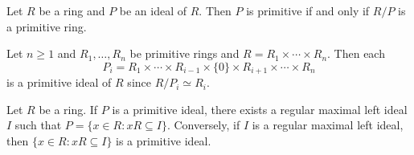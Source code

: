 \begin{exercise}
	\label{xca:primitivo}
	Let $R$ be a ring and $P$ be an ideal of $R$. Then $P$ is primitive if and only if 
	$R/P$ is a primitive ring.
\end{exercise}





\begin{example}
	Let $n\geq1$ and $R_1,\dots,R_n$ be primitive rings and $R=R_1\times\cdots\times
	R_n$. Then each 
    \[
    P_i=R_1\times\cdots\times R_{i-1}\times\{0\}\times
	R_{i+1}\times\cdots\times R_n
    \]
    is a primitive ideal of $R$ since 
	$R/P_i\simeq R_i$.
\end{example}

\begin{lemma}
	\label{lemma:maxprim}
	Let $R$ be a ring. If $P$ is a primitive ideal, there exists a regular 
        maximal left ideal $I$ such that $P=\{x\in R:xR\subseteq I\}$.
	Conversely, if $I$ is a regular maximal left ideal, then 
	$\{x\in R:xR\subseteq I\}$ is a primitive ideal. 
\end{lemma}

